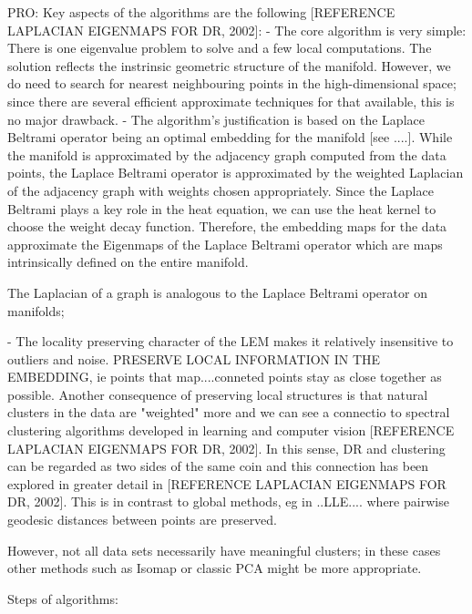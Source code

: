 \documentclass[journal, a4paper]{IEEEtran}
\begin{document}
PRO:
Key aspects of the algorithms are the following [REFERENCE LAPLACIAN EIGENMAPS FOR DR, 2002]:
- The core algorithm is very simple: There is one eigenvalue problem to solve and a few local computations. The solution reflects the instrinsic geometric structure of the manifold. However, we do need to search for nearest neighbouring points in the high-dimensional space; since there are several efficient approximate techniques for that available, this is no major drawback.
- The algorithm's justification is based on the Laplace Beltrami operator being an optimal embedding for the manifold [see ....]. 
While the manifold is approximated by the adjacency graph computed from the data points, the Laplace Beltrami operator is approximated by the weighted Laplacian of the adjacency graph with weights chosen appropriately. %
Since the Laplace Beltrami plays a key role in the heat equation, we can use the heat kernel to choose the weight decay function. Therefore, the embedding maps for the data approximate the Eigenmaps of the Laplace Beltrami operator which are maps intrinsically defined on the entire manifold.

The Laplacian of a graph is analogous to the Laplace Beltrami operator on manifolds; 

- The locality preserving character of the LEM makes it relatively insensitive to outliers and noise. 
PRESERVE LOCAL INFORMATION IN THE EMBEDDING, ie points that map....conneted points stay as close together as possible.
Another consequence of preserving local structures  is that natural clusters in the data are "weighted" more and we can see a connectio to spectral clustering algorithms developed in learning and computer vision [REFERENCE LAPLACIAN EIGENMAPS FOR DR, 2002].
In this sense, DR and clustering can be regarded as two sides of the same coin and this connection has been explored in greater detail in [REFERENCE LAPLACIAN EIGENMAPS FOR DR, 2002]. 
This is in contrast to global methods, eg in ..LLE.... where pairwise geodesic distances between points are preserved.


However, not all data sets necessarily have meaningful clusters; in these cases other methods such as Isomap or classic PCA might be more appropriate. 

Steps of algorithms:
\end{document}

